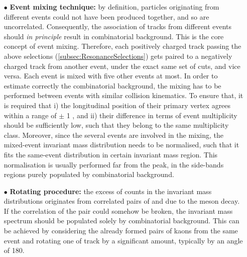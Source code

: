 \begin{itemize}
\item[$\bullet$] \textbf{Event mixing technique:} by definition, particles originating from different events could not have been produced together, and so are uncorrelated. Consequently, the association of tracks from different events should \textit{in principle} result in combinatorial background. This is the core concept of event mixing.
Therefore, each positively charged track passing the above selections (\Sec\ref{subsec:ResonanceSelections}) gets paired to a negatively charged track from another event, under the exact same set of cuts, and vice versa. Each event is mixed with five other events at most.
In order to estimate correctly the combinatorial background, the mixing has to be performed between events with similar collision kinematics. To ensure that, it is required that i) the longitudinal position of their primary vertex agrees within a range of $\pm$ 1 \cm, and ii) their difference in terms of event multiplicity should be sufficiently low, such that they belong to the same multiplicity class. Moreover, since the several events are involved in the mixing, the mixed-event invariant mass distribution needs to be normalised, such that it fits the same-event distribution in certain invariant mass region. This normalisation is usually performed far from the peak, in the side-bands regions purely populated by combinatorial background.
\item[$\bullet$] \textbf{Rotating procedure:} the excess of counts in the invariant mass distributions originates from correlated pairs of \rmKplus and \rmKminus due to the \rmPhiMes meson decay. If the correlation of the pair could somehow be broken, the invariant mass spectrum should be populated solely by combinatorial background. This can be achieved by considering the already formed pairs of kaons from the same event and rotating one of track by a significant amount, typically by an angle of 180\textdegree. 
\end{itemize}


